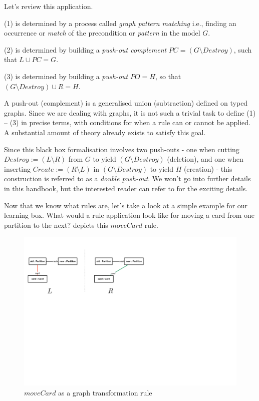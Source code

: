 \vspace{0.5cm}

Let's review this application. 

(1) is determined by a process called \emph{graph pattern matching} i.e., finding an occurrence or
\emph{match} of the precondition or \emph{pattern} in the model $G$.

(2) is determined by building a \emph{push-out complement} $PC = (G\setminus Destroy)$, such that $L\cup PC = G$.

(3) is determined by building a \emph{push-out} $PO = H$, so that $(G\setminus Destroy) \cup R = H$.

A push-out (complement) is a generalised union (subtraction) defined on typed graphs. Since we are dealing with graphs, it is not such a trivial task to define
(1) -- (3) in precise terms, with conditions for when a rule can or cannot be applied. A substantial amount of theory already exists to satisfy this goal.

Since this black box formalisation involves two push-outs - one when cutting $Destroy := (L\setminus R)$ from $G$ to yield $(G\setminus Destroy)$ (deletion),
and one when inserting $Create := (R\setminus L)$ in $(G\setminus Destroy)$ to yield $H$ (creation) - this construction is referred to as a \emph{double
push-out}. We won't go into further details in this handbook, but the interested reader can refer to \cite{EEPT06} for the exciting details.

Now that we know what rules are, let's take a look at a simple example for our learning box. What would a rule application look like for moving a card from
one partition to the next?  depicts this $moveCard$ rule.
  
\begin{figure}[htp]
\begin{center}
  \includegraphics[width=1\textwidth]{../../org.moflon.doc.handbook.03_storyDiagrams/02_transformationsExplained/teImages/rule_example}
  \caption[]{$moveCard$ as a graph transformation rule}	
  \label{fig:rule_example}
\end{center}
\end{figure}


